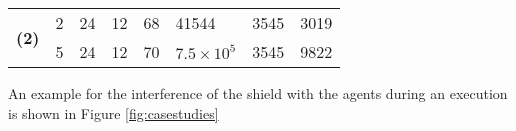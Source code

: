 \begin{table}[]
\begin{tabular}{c|lllllll}
\multirow{2}{*}{\textbf{(2)}}                                             & 2   & 24                                                           & 12                                                            & 68                                                                & 41544                                                 & 3545 & 3019                                                          \\
                                                                          & 5   & 24                                                           & 12                                                            & 70                                                                & $7.5\times 10^5$                                     & 3545 & 9822                                                          
\end{tabular}
\vspace{-0.3cm}
\end{table}
 An example for the interference of the shield with the agents during an execution is shown in Figure \ref{fig:casestudies}
